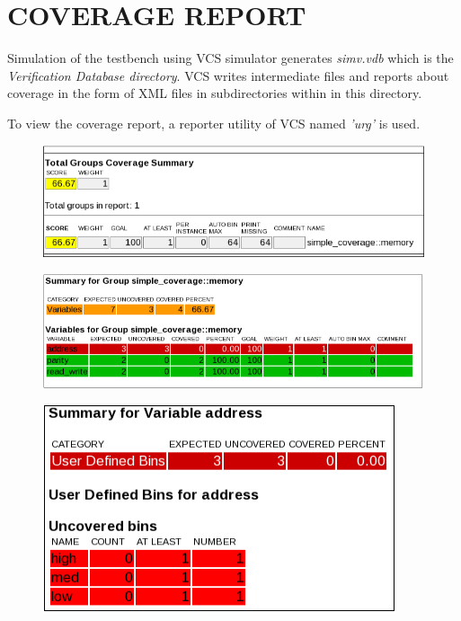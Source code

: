 \section{COVERAGE REPORT}
Simulation of the testbench using VCS simulator generates \emph{simv.vdb} which is the \emph{Verification Database directory}. VCS writes intermediate files and reports about coverage in the form of XML files in subdirectories within in this directory.

To view the coverage report, a reporter utility of VCS named \emph{'urg'} is used.
\vspace{15pt}
\begin{figure}[h!]
\centering
\includegraphics[scale=0.85]{./figures/urgreport2.png}
\label{fig:urgreport2.png}
\end{figure}

\begin{figure}[h!]
\centering
\includegraphics[scale=0.85]{./figures/urgreport3.png}
\label{fig:urgreport3.png}
\end{figure}

\begin{figure}[h!]
\centering
\includegraphics{./figures/urgreport4.png}
\label{fig:urgreport4.png}
\end{figure}

